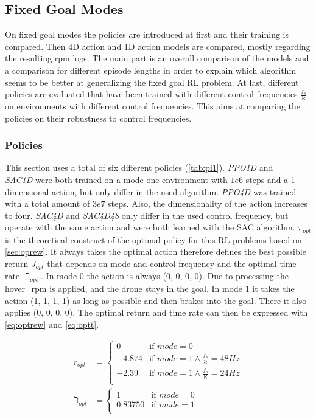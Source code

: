 \subsection{Fixed Goal Modes}
On fixed goal modes the policies are introduced at first and their training is compared. 
Then 4D action and 1D action models are compared, mostly regarding the resulting rpm logs. 
The main part is an overall comparison of the models and a comparison for different episode lengths in order 
to explain which algorithm seems to be better at generalizing the fixed goal RL problem. 
At last, different policies are evaluated that have been trained with different control frequencies $\frac{f_s}{\aleph}$ on environments with different control frequencies. 
This aims at comparing the policies on their robustness to control frequencies.

\subsubsection{Policies}
This section uses a total of six different policies (\cref{tab:pi1}).
\emph{PPO1D} and \\ \emph{SAC1D} were both trained on a mode one 
environment with $1e6$ steps and a 1 dimensional action, 
but only differ in the used algorithm.
 \emph{PPO4D} was trained with a total amount of $3e7$ steps. 
 Also, the dimensionality of the action increases to four.
 \emph{SAC4D} and \emph{SAC4D48} only differ in the used control frequency, but operate with the same action and were both learned with the SAC algorithm.
 \emph{$\pi_{opt}$} is the theoretical construct of the optimal policy for this RL problems based on \cref{sec:oprew}. 
 It always takes the optimal action therefore defines the best possible return $J_{opt}$ that depends on mode and control frequency and the optimal time rate $\beth_{opt}$.
 In mode 0 the action is always (0, 0, 0, 0). 
 Due to processing the hover\_rpm is applied, and the drone stays in the goal. 
 In mode 1 it takes the action (1, 1, 1, 1) as long as possible and then brakes into the goal. 
 There it also applies (0, 0, 0, 0). The optimal return and time rate can then be expressed with \cref{eq:optrew} and \cref{eq:optt}.
 
 \begin{align}
 	r_{opt} &=
 	\left\{
 	\begin{array}{ll}
 		0 & \mbox{if } mode = 0\\
 		-4.874 &\mbox{if } mode = 1 \land \frac{f_s}{\aleph} = 48Hz\\
 		-2.39 &\mbox{if } mode = 1 \land \frac{f_s}{\aleph} = 24Hz\\
 	\end{array}
 	\right. \label{eq:optrew}\\
 	\beth_{opt} &= 
 	\left\{
 	\begin{array}{ll}
 		1 & \mbox{if } mode = 0\\
 		0.83750 &\mbox{if } mode = 1 \\
 	\end{array}
 	\right. \label{eq:optt}
 \end{align}


